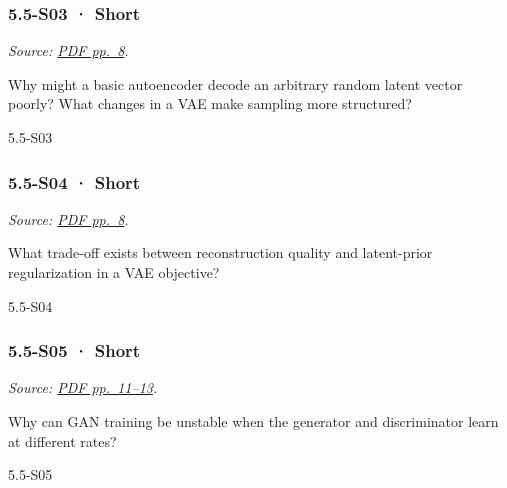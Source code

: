 \noindent\begin{minipage}{\linewidth}

\subsubsection{5.5-S03 · Short}\label{s03-short-16}

\emph{Source:
\href{../Lecture\%20Slides/5.5.\%20Generative\%20Models.pdf\#page=8}{PDF
pp.~8}.}

Why might a basic autoencoder decode an arbitrary random latent vector
poorly? What changes in a VAE make sampling more structured?

\begin{solution}[20mm]{5.5-S03}

\end{solution}
\end{minipage}\par\medskip

\noindent\begin{minipage}{\linewidth}

\subsubsection{5.5-S04 · Short}\label{s04-short-16}

\emph{Source:
\href{../Lecture\%20Slides/5.5.\%20Generative\%20Models.pdf\#page=8}{PDF
pp.~8}.}

What trade-off exists between reconstruction quality and latent-prior
regularization in a VAE objective?

\begin{solution}[20mm]{5.5-S04}

\end{solution}
\end{minipage}\par\medskip

\noindent\begin{minipage}{\linewidth}

\subsubsection{5.5-S05 · Short}\label{s05-short-16}

\emph{Source:
\href{../Lecture\%20Slides/5.5.\%20Generative\%20Models.pdf\#page=11}{PDF
pp.~11--13}.}

Why can GAN training be unstable when the generator and discriminator
learn at different rates?

\begin{solution}[20mm]{5.5-S05}

\end{solution}
\end{minipage}\par\medskip

